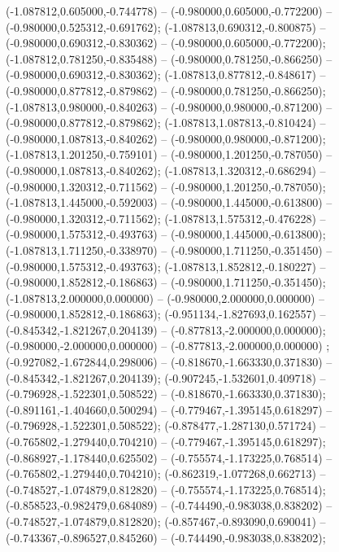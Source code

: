  (-1.087812,0.605000,-0.744778) -- (-0.980000,0.605000,-0.772200) -- (-0.980000,0.525312,-0.691762);
 (-1.087813,0.690312,-0.800875) -- (-0.980000,0.690312,-0.830362) -- (-0.980000,0.605000,-0.772200);
 (-1.087812,0.781250,-0.835488) -- (-0.980000,0.781250,-0.866250) -- (-0.980000,0.690312,-0.830362);
 (-1.087813,0.877812,-0.848617) -- (-0.980000,0.877812,-0.879862) -- (-0.980000,0.781250,-0.866250);
 (-1.087813,0.980000,-0.840263) -- (-0.980000,0.980000,-0.871200) -- (-0.980000,0.877812,-0.879862);
 (-1.087813,1.087813,-0.810424) -- (-0.980000,1.087813,-0.840262) -- (-0.980000,0.980000,-0.871200);
 (-1.087813,1.201250,-0.759101) -- (-0.980000,1.201250,-0.787050) -- (-0.980000,1.087813,-0.840262);
 (-1.087813,1.320312,-0.686294) -- (-0.980000,1.320312,-0.711562) -- (-0.980000,1.201250,-0.787050);
 (-1.087813,1.445000,-0.592003) -- (-0.980000,1.445000,-0.613800) -- (-0.980000,1.320312,-0.711562);
 (-1.087813,1.575312,-0.476228) -- (-0.980000,1.575312,-0.493763) -- (-0.980000,1.445000,-0.613800);
 (-1.087813,1.711250,-0.338970) -- (-0.980000,1.711250,-0.351450) -- (-0.980000,1.575312,-0.493763);
 (-1.087813,1.852812,-0.180227) -- (-0.980000,1.852812,-0.186863) -- (-0.980000,1.711250,-0.351450);
 (-1.087813,2.000000,0.000000) -- (-0.980000,2.000000,0.000000) -- (-0.980000,1.852812,-0.186863);
 (-0.951134,-1.827693,0.162557) -- (-0.845342,-1.821267,0.204139) -- (-0.877813,-2.000000,0.000000);
 (-0.980000,-2.000000,0.000000) -- (-0.877813,-2.000000,0.000000) ;
 (-0.927082,-1.672844,0.298006) -- (-0.818670,-1.663330,0.371830) -- (-0.845342,-1.821267,0.204139);
 (-0.907245,-1.532601,0.409718) -- (-0.796928,-1.522301,0.508522) -- (-0.818670,-1.663330,0.371830);
 (-0.891161,-1.404660,0.500294) -- (-0.779467,-1.395145,0.618297) -- (-0.796928,-1.522301,0.508522);
 (-0.878477,-1.287130,0.571724) -- (-0.765802,-1.279440,0.704210) -- (-0.779467,-1.395145,0.618297);
 (-0.868927,-1.178440,0.625502) -- (-0.755574,-1.173225,0.768514) -- (-0.765802,-1.279440,0.704210);
 (-0.862319,-1.077268,0.662713) -- (-0.748527,-1.074879,0.812820) -- (-0.755574,-1.173225,0.768514);
 (-0.858523,-0.982479,0.684089) -- (-0.744490,-0.983038,0.838202) -- (-0.748527,-1.074879,0.812820);
 (-0.857467,-0.893090,0.690041) -- (-0.743367,-0.896527,0.845260) -- (-0.744490,-0.983038,0.838202);
